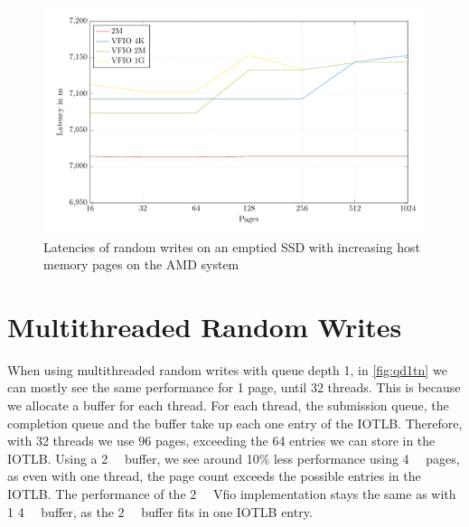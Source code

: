 \begin{figure}[H]
  \centering
  \includegraphics[width=\textwidth]{figures/psmedsepyc}
  \caption{Latencies of random writes on an emptied SSD with increasing host memory pages on the AMD system}
  \label{fig:med-psepyc}
\end{figure}

\section{Multithreaded Random Writes}
When using multithreaded random writes with queue depth 1, in \autoref{fig:qd1tn} we can mostly see the same performance for 1 page, until 32 threads. This is because we allocate a buffer for each thread. For each thread, the submission queue, the completion queue and the buffer take up each one entry of the IOTLB. Therefore, with 32 threads we use 96 pages, exceeding the 64 entries we can store in the IOTLB. Using a \qty{2}{\mebi\byte} buffer, we see around 10\% less performance using \qty{4}{\kibi\byte} pages, as even with one thread, the page count exceeds the possible entries in the IOTLB. The performance of the \qty{2}{\mebi\byte} Vfio implementation stays the same as with 1 \qty{4}{\kibi\byte} buffer, as the \qty{2}{\mebi\byte} buffer fits in one IOTLB entry.

